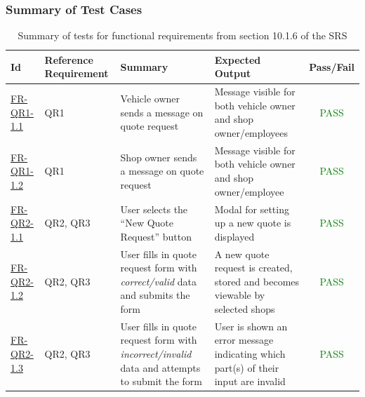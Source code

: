\documentclass[12pt, titlepage]{article}
\newcommand{\testpass}{\textcolor{green}{PASS}}
\begin{document}
        \subsubsection{Summary of Test Cases}
            \begin{table}[H]
                \centering
                \begin{tabularx}{\textwidth}{|l|p{2.3cm}|X|X|c|}
                    \hline
                    Id & Reference Requirement & Summary & Expected Output & Pass/Fail \\ \hline
                    \hyperref[FR-QR1-1.1]{FR-QR1-1.1} & QR1 & Vehicle owner sends a message on quote request & Message visible for both vehicle owner and shop owner/employees & \testpass \\ \hline
                    \hyperref[FR-QR1-1.2]{FR-QR1-1.2} & QR1 & Shop owner sends a message on quote request & Message visible for both vehicle owner and shop owner/employee & \testpass \\ \hline
                    \hyperref[FR-QR2-1.1]{FR-QR2-1.1} & QR2, QR3 & User selects the ``New Quote Request'' button & Modal for setting up a new quote is displayed & \testpass \\ \hline
                    \hyperref[FR-QR2-1.2]{FR-QR2-1.2} & QR2, QR3 & User fills in quote request form with \textit{correct/valid} data and submits the form & A new quote request is created, stored and becomes viewable by selected shops & \testpass \\ \hline
                    \hyperref[FR-QR2-1.3]{FR-QR2-1.3} & QR2, QR3 & User fills in quote request form with \textit{incorrect/invalid} data and attempts to submit the form & User is shown an error message indicating which part(s) of their input are invalid & \testpass \\ \hline
                \end{tabularx}
                \caption{Summary of tests for functional requirements from section 10.1.6 of the SRS}
            \end{table}
\end{document}
